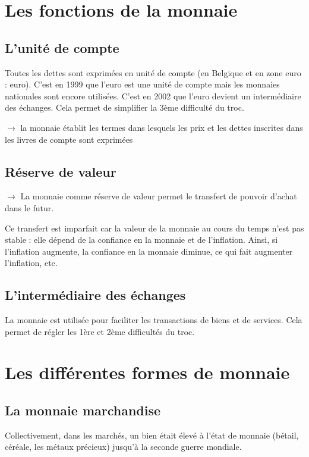 \section{Les fonctions de la monnaie}

	\subsection{L'unité de compte}
	
	Toutes les dettes sont exprimées en unité de compte (en Belgique et en zone euro : euro). C'est en 1999 que l'euro est une unité de compte mais les monnaies nationales sont encore utilisées. C'est en 2002 que l'euro devient un intermédiaire des échanges. Cela permet de simplifier la 3ème difficulté du troc.
	
	$\rightarrow$ la monnaie établit les termes dans lesquels les prix et les dettes inscrites dans les livres de compte sont exprimées
	
	\subsection{Réserve de valeur}
	
	$\rightarrow$ La monnaie comme réserve de valeur permet le transfert de pouvoir d'achat dans le futur. 
	
	Ce transfert est imparfait car la valeur de la monnaie au cours du temps n'est pas stable : elle dépend de la confiance en la monnaie et de l'inflation. Ainsi, si l'inflation augmente, la confiance en la monnaie diminue, ce qui fait augmenter l'inflation, etc.
	
	\subsection{L'intermédiaire des échanges}
	
	La monnaie est utilisée pour faciliter les transactions de biens et de services. Cela permet de régler les 1ère et 2ème difficultés du troc.
	
\section{Les différentes formes de monnaie}

	\subsection{La monnaie marchandise}
	
	Collectivement, dans les marchés, un bien était élevé à l'état de monnaie (bétail, céréale, les métaux précieux) jusqu'à la seconde guerre mondiale.
	
